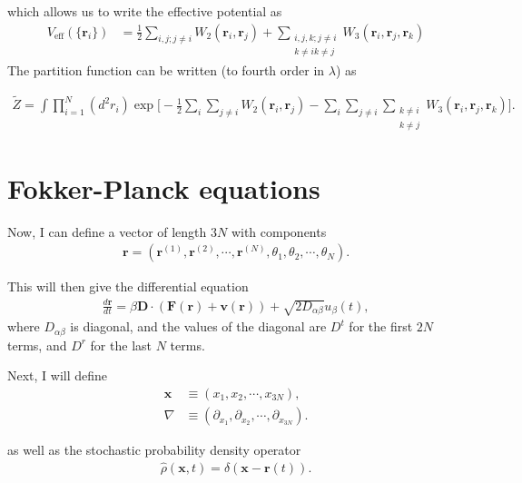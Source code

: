 \documentclass[twocolumn,amsmath,amssymb,aps]{revtex4-1}%
\begin{document}
which allows us to write the effective potential as
\begin{align}
  V_{\mathrm{eff}}(\{\bm{r}_i\})
  &=\frac{1}{2}\sum_{i,j;j\neq i}W_2(\bm{r}_i,\bm{r}_j)
    +\sum_{\substack{i,j,k;j\neq i \\k\neq i k\neq j}}
    W_3(\bm{r}_i,\bm{r}_j,\bm{r}_k)
\end{align}
The partition function can be written (to fourth order in $\lambda$) as
\begin{widetext}
  \begin{align}
    \tilde{Z}=\int\prod_{i=1}^N(d^2r_i)
    \exp\bigg[-\frac{1}{2}\sum_{i}\sum_{j\neq i}W_2(\bm{r}_i,\bm{r}_j)
    -\sum_{i}\sum_{j\neq i}\sum_{\substack{k\neq i \\ k\neq j}}
    W_3(\bm{r}_i,\bm{r}_j,\bm{r}_k)\bigg].
  \end{align}
\end{widetext}



\appendix

\section{Fokker-Planck equations\label{app:fokkerplanck}}

Now, I can define a vector of length $3N$ with components
\begin{align}
  \bm{r}=(\bm{r}^{(1)},\bm{r}^{(2)},\cdots,\bm{r}^{(N)},\theta_1,\theta_2,\cdots,
  \theta_N).
\end{align}

This will then give the differential equation
\begin{align}
  \frac{d\bm{r}}{dt}=\beta\bm{D}\cdot(\bm{F}(\bm{r})+\bm{v}(\bm{r}))
  +\sqrt{2D_{\alpha\beta}}u_{\beta}(t),
\end{align}
where $D_{\alpha\beta}$ is diagonal, and the values of the diagonal are
$D^t$ for the first $2N$ terms, and $D^r$ for the last $N$ terms.

Next, I will define
\begin{align}
  \bm{x}&\equiv(x_1,x_2,\cdots,x_{3N}),\\
  \nabla&\equiv(\partial_{x_1},\partial_{x_2},\cdots,\partial_{x_{3N}}).
\end{align}

as well as the stochastic probability density operator
\begin{align}
  \hat{\rho}(\bm{x},t)=\delta(\bm{x}-\bm{r}(t)).
\end{align}
\end{document}
